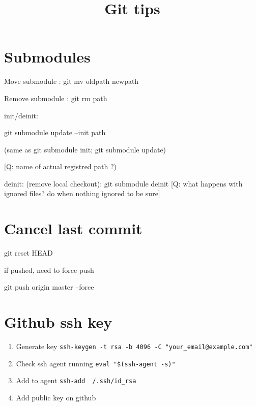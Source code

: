 


\title{Git tips}



\date{}


\maketitle

\justify

\renewcommand{\abstractname}{}

\begin{abstract}

\end{abstract}


\section*{Submodules}

Move submodule : git mv oldpath newpath

Remove submodule : git rm path

init/deinit: 

git submodule update --init path

(same as git submodule init; git submodule update)

[Q: name of actual registred path ?)

deinit: (remove local checkout): git submodule deinit
[Q: what happens with ignored files? do when nothing ignored to be sure]



\section*{Cancel last commit}

git reset HEAD~

if pushed, need to force push 

git push origin master --force



\section*{Github ssh key}


\begin{enumerate}
\item Generate key \texttt{ssh-keygen -t rsa -b 4096 -C "your{\_}email@example.com"}
\item Check ssh agent running \texttt{eval "{\$}(ssh-agent -s)"}
\item Add to agent \texttt{ssh-add ~/.ssh/id{\_}rsa}
\item Add public key on github
\end{enumerate}





